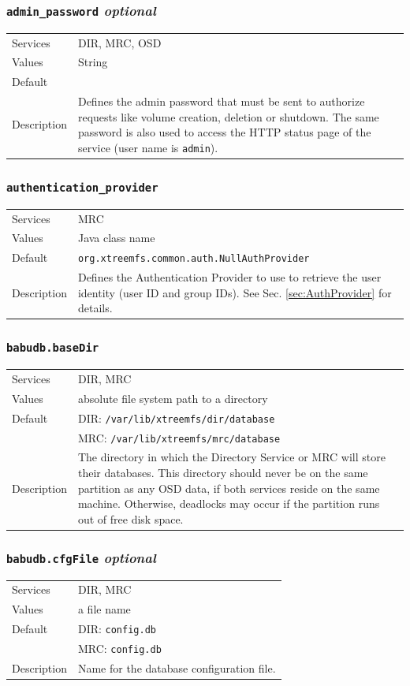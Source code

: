 \documentclass[a4paper,10pt]{book}
\begin{document}
\subsubsection{\texttt{admin\_password} \textit{optional}}
\begin{tabular}{lp{10cm}}
 Services & DIR, MRC, OSD\\
 Values   & String \\
 Default  & \\
 Description & Defines the admin password that must be sent to authorize requests like volume creation, deletion or shutdown. The same password is also used to access the HTTP status page of the service (user name is \texttt{admin}).
\end{tabular}

\subsubsection{\texttt{authentication\_provider}}
\begin{tabular}{lp{10cm}}
 Services & MRC\\
 Values   & Java class name \\
 Default  & \texttt{org.xtreemfs.common.auth.NullAuthProvider}\\
 Description & Defines the Authentication Provider to use to retrieve the user identity (user ID and group IDs). See Sec. \ref{sec:AuthProvider} for details.
\end{tabular}

\subsubsection{\texttt{babudb.baseDir}}
\begin{tabular}{lp{10cm}}
 Services & DIR, MRC\\
 Values   & absolute file system path to a directory\\
 Default  & DIR: \texttt{/var/lib/xtreemfs/dir/database}\\
          & MRC: \texttt{/var/lib/xtreemfs/mrc/database}\\
 Description & The directory in which the Directory Service or MRC will store their databases. This directory should never be on the same partition as any OSD data, if both services reside on the same machine. Otherwise, deadlocks may occur if the partition runs out of free disk space.
\end{tabular}

\subsubsection{\texttt{babudb.cfgFile} \textit{optional}}
\begin{tabular}{lp{10cm}}
 Services & DIR, MRC\\
 Values   & a file name\\
 Default  & DIR: \texttt{config.db}\\
          & MRC: \texttt{config.db}\\
 Description & Name for the database configuration file.
\end{tabular}
\end{document}
